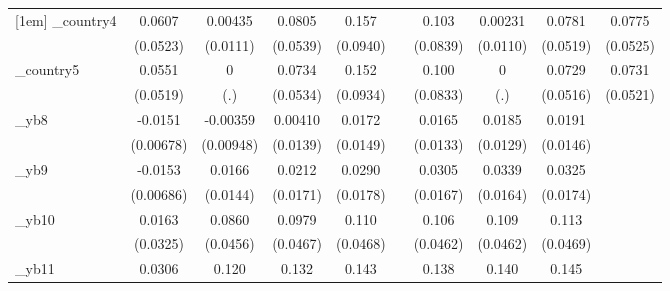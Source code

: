 \begin{table}[htbp]
\begin{tabular}{l*{9}{c}}
[1em]
\_country4   &      0.0607         &     0.00435         &      0.0805         &       0.157\sym{*}  &                     &       0.103         &     0.00231         &      0.0781         &      0.0775         \\
            &    (0.0523)         &    (0.0111)         &    (0.0539)         &    (0.0940)         &                     &    (0.0839)         &    (0.0110)         &    (0.0519)         &    (0.0525)         \\
[1em]
\_country5   &      0.0551         &           0         &      0.0734         &       0.152         &                     &       0.100         &           0         &      0.0729         &      0.0731         \\
            &    (0.0519)         &         (.)         &    (0.0534)         &    (0.0934)         &                     &    (0.0833)         &         (.)         &    (0.0516)         &    (0.0521)         \\
[1em]
\_yb8        &     -0.0151\sym{**} &    -0.00359         &     0.00410         &      0.0172         &                     &      0.0165         &      0.0185         &      0.0191         &                     \\
            &   (0.00678)         &   (0.00948)         &    (0.0139)         &    (0.0149)         &                     &    (0.0133)         &    (0.0129)         &    (0.0146)         &                     \\
[1em]
\_yb9        &     -0.0153\sym{**} &      0.0166         &      0.0212         &      0.0290         &                     &      0.0305\sym{*}  &      0.0339\sym{**} &      0.0325\sym{*}  &                     \\
            &   (0.00686)         &    (0.0144)         &    (0.0171)         &    (0.0178)         &                     &    (0.0167)         &    (0.0164)         &    (0.0174)         &                     \\
[1em]
\_yb10       &      0.0163         &      0.0860\sym{*}  &      0.0979\sym{**} &       0.110\sym{**} &                     &       0.106\sym{**} &       0.109\sym{**} &       0.113\sym{**} &                     \\
            &    (0.0325)         &    (0.0456)         &    (0.0467)         &    (0.0468)         &                     &    (0.0462)         &    (0.0462)         &    (0.0469)         &                     \\
[1em]
\_yb11       &      0.0306         &       0.120\sym{**} &       0.132\sym{**} &       0.143\sym{**} &                     &       0.138\sym{**} &       0.140\sym{**} &       0.145\sym{**} &                     \\

\end{tabular}
\end{table}
